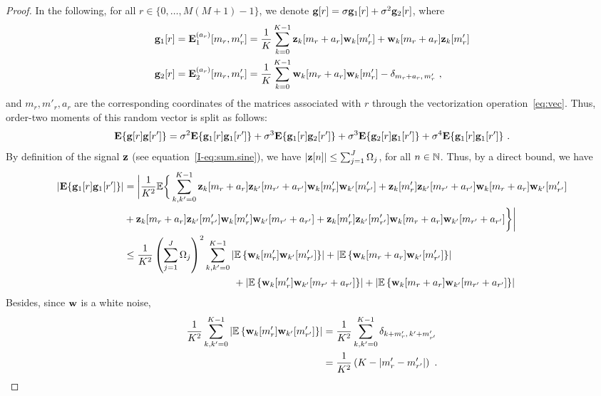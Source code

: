 \documentclass[journal,onecolumn]{IEEEtran}
\begin{document}
\begin{proof}
In the following, for all $r\in\{0,\ldots,M(M+1)-1\}$, we denote ${\mathbf g}[r] = \sigma{\mathbf g}_1[r] + \sigma^2{\mathbf g}_2[r]$, where 
\begin{align*}
{\mathbf g}_1[r] &= {\mathbf E}_1^{(a_r)}[m_r,m'_r] = \dfrac1K\sum_{k=0}^{K-1} {\mathbf z}_k[m_r+a_r]{\mathbf w}_k[m'_r] + {\mathbf w}_k[m_r+a_r]{\mathbf z}_k[m'_r] \\
{\mathbf g}_2[r] &= {\mathbf E}_2^{(a_r)}[m_r,m'_r] = \dfrac1K\sum_{k=0}^{K-1} {\mathbf w}_k[m_r+a_r]{\mathbf w}_k[m'_r] - \delta_{m_r+a_r,\,m'_r} \ ,
\end{align*}
and $m_r,m'_r, a_r$ are the corresponding coordinates of the matrices associated with $r$ through the vectorization operation~\eqref{eq:vec}. Thus, order-two moments of this random vector is split as follows:
\begin{equation}
\bE\{\bg[r]\bg[r']\} = \sigma^2\bE\{\bg_1[r]\bg_1[r']\} + \sigma^3\bE\{\bg_1[r]\bg_2[r']\} + \sigma^3\bE\{\bg_2[r]\bg_1[r']\} + \sigma^4\bE\{\bg_1[r]\bg_1[r']\}\ .
\label{eq:gg}
\end{equation}
By definition of the signal ${\mathbf z}$ (see equation~\eqref{I-eq:sum.sine}), we have $|{\mathbf z}[n]|\leq\sum_{j=1}^J\Omega_j$, for all $n\in\mathbb N$. Thus, by a direct bound, we have
\begin{align}
\nonumber
\left|\bE\{\bg_1[r]\bg_1[r']\}\right| & = \bigg|\dfrac1{K^2}\EE\bigg\{\sum_{k,k'=0}^{K-1} \bz_k[m_r+a_r]\bz_{k'}[m_{r'}+a_{r'}]\bw_k[m'_r]\bw_{k'}[m'_{r'}] + \bz_k[m'_r]\bz_{k'}[m_{r'}+a_{r'}]\bw_k[m_r+a_r]\bw_{k'}[m'_{r'}] \\
\nonumber
&+ \bz_k[m_r+a_r]\bz_{k'}[m'_{r'}]\bw_k[m'_r]\bw_{k'}[m_{r'}+a_{r'}] + \bz_k[m'_r]\bz_{k'}[m'_{r'}]\bw_k[m_r+a_r]\bw_{k'}[m_{r'}+a_{r'}]\bigg\} \bigg| \\
\nonumber
& \leq \dfrac1{K^2}\left(\sum_{j=1}^J \Omega_j\right)^2 \sum_{k,k'=0}^{K-1} \left|\EE\left\{\bw_k[m'_r]\bw_{k'}[m'_{r'}]\right\}\right| + \left|\EE\left\{\bw_k[m_r+a_r]\bw_{k'}[m'_{r'}]\right\}\right|  \\
&\hspace{110pt}  + \left|\EE\left\{\bw_k[m'_r]\bw_{k'}[m_{r'}+a_{r'}]\right\}\right| + \left|\EE\left\{\bw_k[m_r+a_r]\bw_{k'}[m_{r'}+a_{r'}]\right\}\right|
\label{eq:sum.g1g1}
\end{align}
Besides, since ${\mathbf w}$ is a white noise,
\begin{align*}
\dfrac1{K^2}\sum_{k,k'=0}^{K-1} \left|\EE\left\{\bw_k[m'_r]\bw_{k'}[m'_{r'}]\right\}\right| & = \dfrac1{K^2}\sum_{k,k'=0}^{K-1} \delta_{k+m'_r,\,k'+m'_{r'}}  \\
&= \dfrac1{K^2}\left(K-\left|m'_r-m'_{r'}\right|\right) \ .

\end{align*}
\end{proof}
\end{document}
